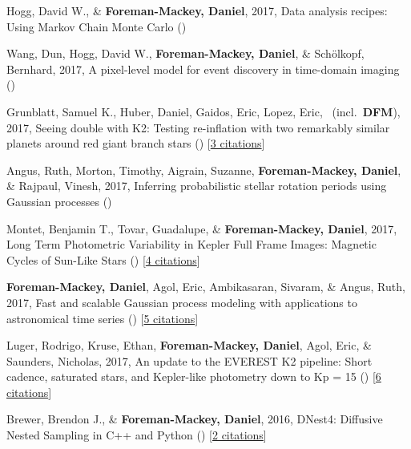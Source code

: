 \item[{\color{numcolor}\scriptsize10}] Hogg, David W., \& \textbf{Foreman-Mackey, Daniel}, 2017, Data analysis recipes: Using Markov Chain Monte Carlo ()

\item[{\color{numcolor}\scriptsize9}] Wang, Dun, Hogg, David W., \textbf{Foreman-Mackey, Daniel}, \& Sch{\"o}lkopf, Bernhard, 2017, A pixel-level model for event discovery in time-domain imaging ()

\item[{\color{numcolor}\scriptsize8}] Grunblatt, Samuel K., Huber, Daniel, Gaidos, Eric, Lopez, Eric, \etal\ (incl.\ \textbf{DFM}), 2017, Seeing double with K2: Testing re-inflation with two remarkably similar planets around red giant branch stars () [\href{http://adsabs.harvard.edu/abs/2017arXiv170605865G}{3 citations}]

\item[{\color{numcolor}\scriptsize7}] Angus, Ruth, Morton, Timothy, Aigrain, Suzanne, \textbf{Foreman-Mackey, Daniel}, \& Rajpaul, Vinesh, 2017, Inferring probabilistic stellar rotation periods using Gaussian processes ()

\item[{\color{numcolor}\scriptsize6}] Montet, Benjamin T., Tovar, Guadalupe, \& \textbf{Foreman-Mackey, Daniel}, 2017, Long Term Photometric Variability in Kepler Full Frame Images: Magnetic Cycles of Sun-Like Stars () [\href{http://adsabs.harvard.edu/abs/2017arXiv170507928M}{4 citations}]

\item[{\color{numcolor}\scriptsize5}] \textbf{Foreman-Mackey, Daniel}, Agol, Eric, Ambikasaran, Sivaram, \& Angus, Ruth, 2017, Fast and scalable Gaussian process modeling with applications to astronomical time series () [\href{http://adsabs.harvard.edu/abs/2017arXiv170309710F}{5 citations}]

\item[{\color{numcolor}\scriptsize4}] Luger, Rodrigo, Kruse, Ethan, \textbf{Foreman-Mackey, Daniel}, Agol, Eric, \& Saunders, Nicholas, 2017, An update to the EVEREST K2 pipeline: Short cadence, saturated stars, and Kepler-like photometry down to Kp = 15 () [\href{http://adsabs.harvard.edu/abs/2017arXiv170205488L}{6 citations}]

\item[{\color{numcolor}\scriptsize3}] Brewer, Brendon J., \& \textbf{Foreman-Mackey, Daniel}, 2016, DNest4: Diffusive Nested Sampling in C++ and Python () [\href{http://adsabs.harvard.edu/abs/2016arXiv160603757B}{2 citations}]

